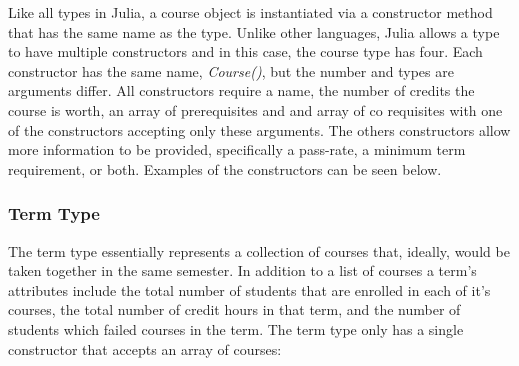 \documentclass[botnum, fleqn]{unmeethesis}
\begin{document}

        Like all types in Julia, a course object is instantiated via a constructor method that has the same name as the type. Unlike other languages, Julia allows a type to have multiple constructors and in this case, the course type has four. Each constructor has the same name, \textit{Course()}, but the number and types are arguments differ. All constructors require a name, the number of credits the course is worth, an array of prerequisites and and array of co requisites with one of the constructors accepting only these arguments. The others constructors allow more information to be provided, specifically a pass-rate, a minimum term requirement, or both. Examples of the constructors can be seen below.

        

      \subsubsection{Term Type}
        The term type essentially represents a collection of courses that, ideally, would be taken together in the same semester. In addition to a list of courses a term's attributes include the total number of students that are enrolled in each of it's courses, the total number of credit hours in that term, and the number of students which failed courses in the term. The term type only has a single constructor that accepts an array of courses:


\end{document}

